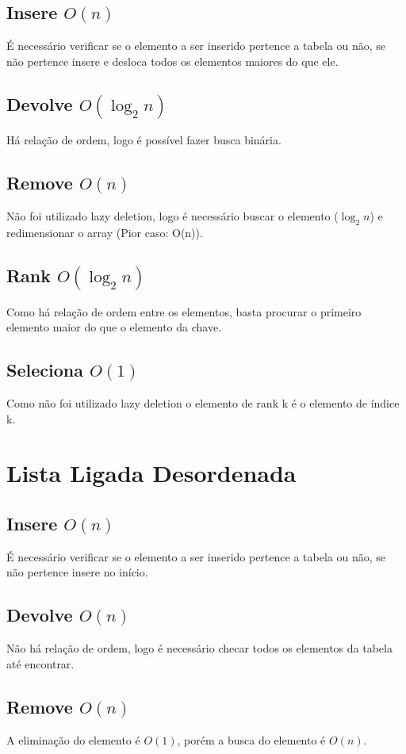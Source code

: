 \documentclass[14pt]{article}
\begin{document}
{\subsection{Insere $O(n)$} 
É necessário verificar se o elemento a ser inserido pertence a tabela ou não, se não pertence insere 
e desloca todos os elementos maiores do que ele.
\subsection{Devolve $O(\log_{2}n)$}
Há relação de ordem, logo é possível fazer busca binária.
\subsection{Remove $O(n)$}
Não foi utilizado lazy deletion, logo é necessário buscar o elemento ($\log_{2}n$) e redimensionar o array (Pior 
caso: O(n)).
\subsection{Rank $O(\log_{2}n)$}
Como há relação de ordem entre os elementos, basta procurar o primeiro elemento maior do que o elemento da 
chave.
\subsection{Seleciona $O(1)$}
Como não foi utilizado lazy deletion o elemento de rank k é o elemento de índice k.
\\

\section{Lista Ligada Desordenada}

\subsection{Insere $O(n)$} 
É necessário verificar se o elemento a ser inserido pertence a tabela ou não, se não pertence insere no início.
\subsection{Devolve $O(n)$}
Não há relação de ordem, logo é necessário checar todos os elementos da tabela até encontrar.
\subsection{Remove $O(n)$}
A eliminação do elemento é $O(1)$, porém a busca do elemento é $O(n)$.
}
\end{document}

